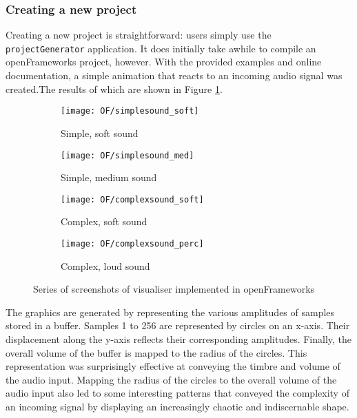 \documentclass[../../initial_thesis.tex]{subfiles}
\begin{document}
\subsubsection{Creating a new project}
Creating a new project is straightforward: users simply use the \verb|projectGenerator| application. It does initially take awhile to compile an openFrameworks project, however. With the provided examples and online documentation, a simple animation that reacts to an incoming audio signal was created.\footnotemark The results of which are shown in Figure \ref{fig:OFVisualiser}.


\begin{figure}
  \begin{subfigure}{0.5\textwidth}
    \texttt{[image: OF/simplesound\_soft]}
    \caption{Simple, soft sound}
  \end{subfigure} 
 \begin{subfigure}{0.5\textwidth}
    \texttt{[image: OF/simplesound\_med]}
    \caption{Simple, medium sound}
  \end{subfigure}
  \begin{subfigure}{0.5\textwidth}
    \texttt{[image: OF/complexsound\_soft]}
    \caption{Complex, soft sound}
  \end{subfigure}
  \begin{subfigure}{0.5\textwidth}
    \texttt{[image: OF/complexsound\_perc]}
    \caption{Complex, loud sound}
  \end{subfigure}
  \caption{Series of screenshots of visualiser implemented in openFrameworks}
  \label{fig:OFVisualiser}
\end{figure}

The graphics are generated by representing the various amplitudes of samples stored in a buffer. Samples 1 to 256 are represented by circles on an x-axis. Their displacement along the y-axis reflects their corresponding amplitudes. Finally, the overall volume of the buffer is mapped to the radius of the circles. This representation was surprisingly effective at conveying the timbre and volume of the audio input. Mapping the radius of the circles to the overall volume of the audio input also led to some interesting patterns that conveyed the complexity of an incoming signal by displaying an increasingly chaotic and indiscernable shape.
\end{document}
